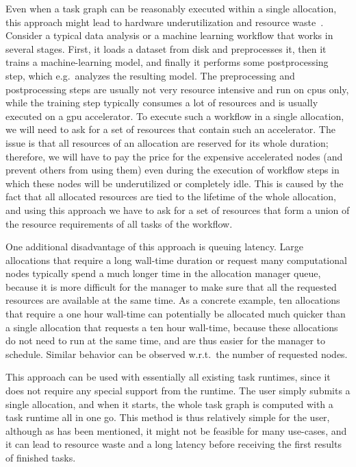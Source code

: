Even when a task graph can be reasonably executed within a single allocation, this approach might
lead to hardware underutilization and resource waste~\cite{ehpc}. Consider a typical
data analysis or a machine learning workflow that works in several stages. First, it loads a
dataset from disk and preprocesses it, then it trains a machine-learning model, and finally it
performs some postprocessing step, which e.g.\ analyzes the resulting model. The preprocessing
and postprocessing steps are usually not very resource intensive and run on
\glspl{cpu} only, while the training step typically consumes a lot of resources and is
usually executed on a \gls{gpu} accelerator. To execute such a workflow in a single
allocation, we will need to ask for a set of resources that contain such an accelerator. The issue
is that all resources of an allocation are reserved for its whole duration; therefore, we will have
to pay the price for the expensive accelerated nodes (and prevent others from using them) even
during the execution of workflow steps in which these nodes will be underutilized or completely
idle. This is caused by the fact that all allocated resources are tied to the lifetime of the whole
allocation, and using this approach we have to ask for a set of resources that form a union of the
resource requirements of all tasks of the workflow.

One additional disadvantage of this approach is queuing latency. Large allocations that require a
long wall-time duration or request many computational nodes typically spend a much longer time in
the allocation manager queue, because it is more difficult for the manager to make sure that all
the requested resources are available at the same time. As a concrete example, ten allocations that
require a one hour wall-time can potentially be allocated much quicker than a single allocation
that requests a ten hour wall-time, because these allocations do not need to run at the same time,
and are thus easier for the manager to schedule. Similar behavior can be observed w.r.t.\ the
number of requested nodes.

This approach can be used with essentially all existing task runtimes, since it does not require
any special support from the runtime. The user simply submits a single allocation, and when it
starts, the whole task graph is computed with a task runtime all in one go. This method is thus
relatively simple for the user, although as has been mentioned, it might not be feasible for many
use-cases, and it can lead to resource waste and a long latency before receiving the first results
of finished tasks.

